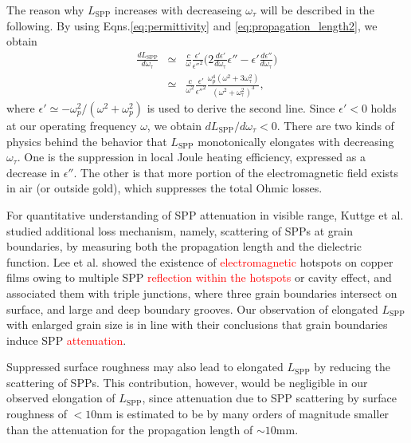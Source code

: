 \documentclass[aip,apl,reprint]{revtex4-1}
\begin{document}
\color{red}
The reason why $L_{\mathrm{SPP}}$ increases with decreaseing $\omega_{\tau}$ will be described in the following. By using Eqns.\ref{eq:permittivity} and \ref{eq:propagation_length2}, we obtain
\begin{eqnarray}
\frac{dL_{\mathrm{SPP}}}{d\omega_{\mathrm{\tau}}} &\simeq& \frac{c}{\omega} \frac{\epsilon'}{\epsilon''^2} \biggl( 2\frac{d\epsilon'}{d\omega_{\mathrm{\tau}}}\epsilon'' - \epsilon' \frac{d\epsilon''}{d\omega_{\mathrm{\tau}}} \biggr) \nonumber \\
&\simeq& \frac{c}{\omega^2} \frac{\epsilon'}{\epsilon''^2} \frac{\omega_p^4 (\omega^2+3\omega_{\mathrm{\tau}}^2)}{ (\omega^2+\omega_{\mathrm{\tau}}^2)^3},
\end{eqnarray}
where $\epsilon' \simeq -\omega_p^2/(\omega^2+\omega_p^2)$ is used to derive the second line. Since $\epsilon'<0$ holds at our operating frequency $\omega$, we obtain $dL_{\mathrm{SPP}}/d\omega_{\tau} < 0$. 
There are two kinds of physics behind the behavior that $L_{\mathrm{SPP}}$ monotonically elongates with decreasing $\omega_{\tau}$. One is the suppression in local Joule heating efficiency, expressed as a decrease in $\epsilon''$. The other is that more portion of the electromagnetic field exists in air (or outside gold), which suppresses the total Ohmic losses.

\color{black}
For quantitative understanding of SPP attenuation in visible range, Kuttge et al.\cite{Kuttge} studied additional loss mechanism, namely, scattering of SPPs at grain boundaries, by measuring both the propagation length and the dielectric function. 
Lee et al.\cite{Lee} showed the existence of \textcolor{red}{electromagnetic} hotspots on copper films owing to multiple SPP \textcolor{red}{reflection within the hotspots} or cavity effect, and associated them with triple junctions, where three grain boundaries intersect on surface, and large and deep boundary grooves. Our observation of elongated $L_{\mathrm{SPP}}$ with enlarged grain size is in line with their conclusions that grain boundaries induce SPP \textcolor{red}{attenuation}.
 
 
Suppressed surface roughness may also lead to elongated $L_{\mathrm{SPP}}$ by reducing the scattering of SPPs. This contribution, however, would be negligible in our observed elongation of $L_{\mathrm{SPP}}$, since attenuation due to SPP scattering by surface roughness of $<10 \mathrm{nm}$ is estimated to be by many orders of magnitude smaller than the attenuation for the propagation length of $\sim10 \mathrm{mm}$\cite{Shiba, Kuttge, Mills}.
\end{document}
